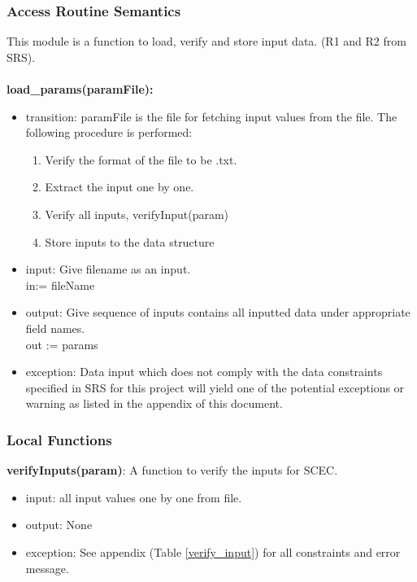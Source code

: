 \documentclass[12pt, titlepage]{article}
\begin{document}
\subsubsection{Access Routine Semantics}
This module is a function to load, verify and store input data. (R1 and R2 from SRS). \\ \\
\noindent \textbf{load\_params(paramFile):}
\begin{itemize}
\item transition:  paramFile is the file for fetching input values from the file. The following procedure is performed: 
\begin{enumerate}
    \item Verify the format of the file to be .txt. 
    \item Extract the input one by one. 
    \item Verify all inputs, verifyInput(param)
    \item Store inputs to the data structure 
\end{enumerate}
\item input: Give filename as an input. \\  in:= fileName 
\item output: Give sequence of inputs contains all inputted data under appropriate field names. \\ 
out := params 
\item exception: Data input which does not comply with the data constraints specified in SRS for this project will yield one of the potential exceptions or warning as listed in the appendix of this document. 
\end{itemize}

\subsubsection{Local Functions}

\textbf{verifyInputs(param)}: A function to verify the inputs for SCEC. 
\begin{itemize}
    \item input: all input values one by one from file. 
    \item output: None
    \item exception: See appendix (Table \ref{verify_input}) for all constraints and error message.  
    
\end{itemize}
\end{document}
